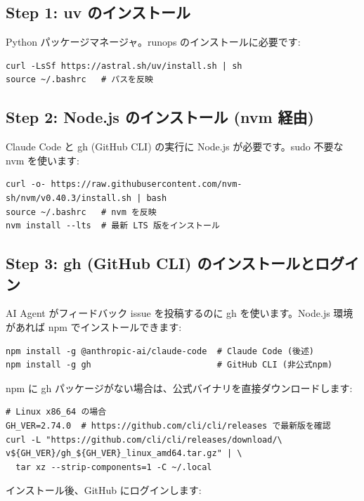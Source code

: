 \documentclass[a4paper,11pt]{article}
\begin{document}
\subsection*{\color{accent} Step 1: uv のインストール}

Python パッケージマネージャ。runops のインストールに必要です:

\begin{lstlisting}
curl -LsSf https://astral.sh/uv/install.sh | sh
source ~/.bashrc   # パスを反映
\end{lstlisting}

\subsection*{\color{accent} Step 2: Node.js のインストール (nvm 経由)}

Claude Code と gh (GitHub CLI) の実行に Node.js が必要です。sudo 不要な nvm を使います:

\begin{lstlisting}
curl -o- https://raw.githubusercontent.com/nvm-sh/nvm/v0.40.3/install.sh | bash
source ~/.bashrc   # nvm を反映
nvm install --lts  # 最新 LTS 版をインストール
\end{lstlisting}

\subsection*{\color{accent} Step 3: gh (GitHub CLI) のインストールとログイン}

AI Agent がフィードバック issue を投稿するのに gh を使います。Node.js 環境があれば npm でインストールできます:

\begin{lstlisting}
npm install -g @anthropic-ai/claude-code  # Claude Code (後述)
npm install -g gh                         # GitHub CLI (非公式npm)
\end{lstlisting}

npm に gh パッケージがない場合は、公式バイナリを直接ダウンロードします:

\begin{lstlisting}
# Linux x86_64 の場合
GH_VER=2.74.0  # https://github.com/cli/cli/releases で最新版を確認
curl -L "https://github.com/cli/cli/releases/download/\
v${GH_VER}/gh_${GH_VER}_linux_amd64.tar.gz" | \
  tar xz --strip-components=1 -C ~/.local
\end{lstlisting}

インストール後、GitHub にログインします:
\end{document}
